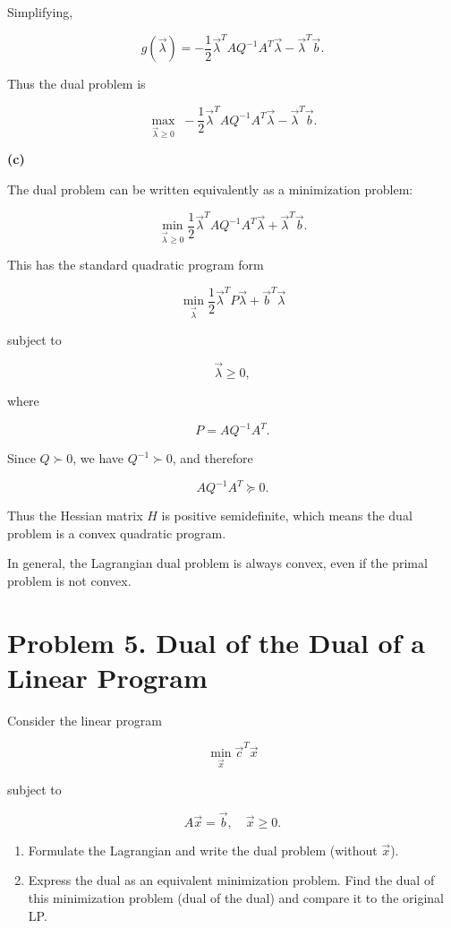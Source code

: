 \documentclass[
	12pt,
]{fphw}
\begin{document}
Simplifying,

\[
g(\vec{\lambda})
=
-\frac{1}{2}\vec{\lambda}^T A Q^{-1} A^T \vec{\lambda}
-
\vec{\lambda}^T \vec{b}.
\]

Thus the dual problem is

\[
\max_{\vec{\lambda} \ge 0}
\;
-\frac{1}{2}\vec{\lambda}^T A Q^{-1} A^T \vec{\lambda}
-
\vec{\lambda}^T \vec{b}.
\]

\bigskip

\textbf{(c)}

The dual problem can be written equivalently as a minimization problem:

\[
\min_{\vec{\lambda} \ge 0}
\frac{1}{2}\vec{\lambda}^T A Q^{-1} A^T \vec{\lambda}
+
\vec{\lambda}^T \vec{b}.
\]

This has the standard quadratic program form

\[
\min_{\vec{\lambda}}
\frac{1}{2}\vec{\lambda}^T P \vec{\lambda} + \vec{b}^T\vec{\lambda}
\]

subject to

\[
\vec{\lambda} \ge 0,
\]

where

\[
P = A Q^{-1} A^T.
\]

Since $Q \succ 0$, we have $Q^{-1} \succ 0$, and therefore

\[
A Q^{-1} A^T \succeq 0.
\]

Thus the Hessian matrix $H$ is positive semidefinite, which means the dual problem is a convex quadratic program.

In general, the Lagrangian dual problem is always convex, even if the primal problem is not convex.


\newpage
\section*{Problem 5. Dual of the Dual of a Linear Program}


Consider the linear program

\[
\min_{\vec{x}} \vec{c}^T\vec{x}
\]

subject to

\[
A\vec{x}= \vec{b},\quad \vec{x}\ge0.
\]

\begin{enumerate}
\item[(a)] Formulate the Lagrangian and write the dual problem (without $\vec{x}$).

\item[(b)] Express the dual as an equivalent minimization problem. Find the dual of this minimization problem (dual of the dual) and compare it to the original LP.
\end{enumerate}
\end{document}
